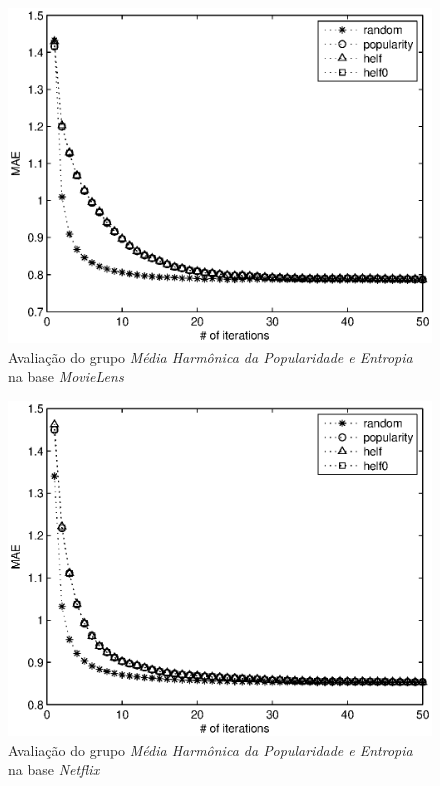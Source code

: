 \begin{figure}[ht]
\centering
\includegraphics{ml_helf_helf0.eps}
\caption{Avaliação do grupo \textit{Média Harmônica da Popularidade e Entropia} na base \textit{MovieLens}}
\label{fig:helf-movielens}
\end{figure}

\begin{figure}[ht]
\centering
\includegraphics{nf_helf_helf0.eps}
\caption{Avaliação do grupo \textit{Média Harmônica da Popularidade e Entropia} na base \textit{Netflix}}
\label{fig:helf-netflix}
\end{figure}

